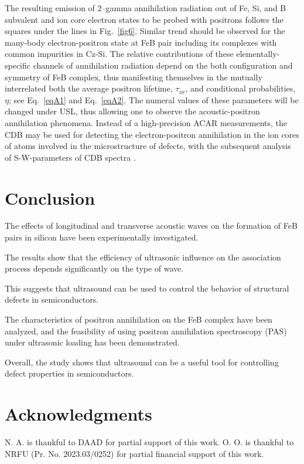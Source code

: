 \documentclass{ttp}
\begin{document}
The resulting emission of 2–gamma annihilation radiation out of Fe, Si, and B subvalent and ion core electron states 
to be probed with positrons follows the squares under the lines in Fig.~\ref{fig6}. 
Similar trend should be observed for the many-body electron-positron state at FeB pair including its complexes with common impurities in Cz-Si. 
The relative contributions of these elementally-specific channels of annihilation radiation depend on the both configuration and symmetry of FeB complex, 
thus manifesting themselves in the mutually interrelated both the average positron lifetime, 
$\tau_\mathrm{av}$, and conditional probabilities, $\eta$; 
see Eq.~\ref{eqA1} and Eq.~\ref{eqA2}. 
The numeral values of these parameters will be changed under USL, 
thus allowing one to observe the acoustic-positron annihilation phenomena. 
Instead of a high-precision ACAR measurements, the CDB may be used for detecting the electron-positron annihilation in the ion cores 
of atoms involved in the microstructure of defects, with the subsequent analysis of S-W-parameters of CDB spectra \cite{Krause1999}.

\section{Conclusion}


The effects of longitudinal and transverse acoustic waves on the formation of FeB pairs in silicon have been experimentally investigated.

The results show that the efficiency of ultrasonic influence on the association process depends significantly on the type of wave.

This suggests that ultrasound can be used to control the behavior of structural defects in semiconductors.

The characteristics of positron annihilation on the FeB complex have been analyzed, and the feasibility of using positron annihilation spectroscopy (PAS) under ultrasonic loading has been demonstrated.

Overall, the study shows that ultrasound can be a useful tool for controlling defect properties in semiconductors.



\section{Acknowledgments}
N. A. is thankful to DAAD for partial support of this work.
O. O. is thankful to NRFU (Pr. No. 2023.03/0252) for partial financial support of this work.
\end{document}
